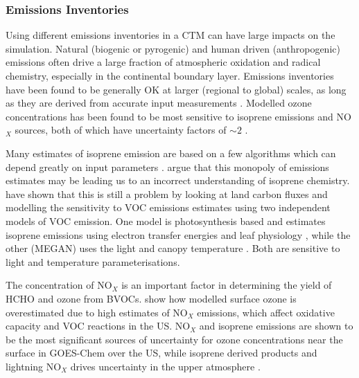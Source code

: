     
    \subsubsection{Emissions Inventories}
      Using different emissions inventories in a CTM can have large impacts on the simulation.
      Natural (biogenic or pyrogenic) and human driven (anthropogenic) emissions often drive a large fraction of atmospheric oxidation and radical chemistry, especially in the continental boundary layer.
      Emissions inventories have been found to be generally OK at larger (regional to global) scales, as long as they are derived from accurate input measurements \parencite{Zeng2015}.
      Modelled ozone concentrations has been found to be most sensitive to isoprene emissions and NO$_X$ sources, both of which have uncertainty factors of $\sim 2$ \parencite{Christian2017}.
      
      Many estimates of isoprene emission are based on a few algorithms which can depend greatly on input parameters \parencite{Arneth2008,Niinemets2010}.
      \textcite{Arneth2008} argue that this monopoly of emissions estimates may be leading us to an incorrect understanding of isoprene chemistry.
      \textcite{Yue2015} have shown that this is still a problem by looking at land carbon fluxes and modelling the sensitivity to VOC emissions estimates using two independent models of VOC emission.
      One model is photosynthesis based and estimates isoprene emissions using electron transfer energies and leaf physiology \parencite{Niinemets1999}, while the other (MEGAN) uses the light and canopy temperature \parencite{Guenther1995,Arneth2007}.
      Both are sensitive to light and temperature parameterisations.
      
      The concentration of NO$_X$ is an important factor in determining the yield of HCHO and ozone from BVOCs.
      \textcite{Travis2016} show how modelled surface ozone is overestimated due to high estimates of NO$_X$ emissions, which affect oxidative capacity and VOC reactions in the US.
      NO$_X$ and isoprene emissions are shown to be the most significant sources of uncertainty for ozone concentrations near the surface in GOES-Chem over the US, while isoprene derived products and lightning NO$_X$ drives uncertainty in the upper atmosphere \parencite{Christian2017}.
      
